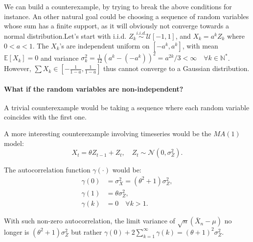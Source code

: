 We can build a counterexample, by trying to break the above conditions for instance. An other natural goal could be choosing a sequence of random variables whose sum has a finite support, as it will obviously not converge towards a normal distribution.\newline Let's start with i.i.d. $Z_k \stackrel{i.i.d.}{\sim} \mathcal{U}\left[-1, 1\right]$, and $X_k = a^k Z_k$ where $0<a<1$. The $X_k$'s are independent uniform on $\left[-a^k, a^k\right]$, with mean $\mathbb{E}\left[X_k\right] = 0$ and variance  $\sigma_k^2 = \frac1{12}(a^k - (-a^k))^2 = a^{2k}/3 < \infty \quad \forall k \in \mathbb{N}^{*}$. However, $\sum X_k \in \left[-\frac1{1-a}, \frac1{1-a}\right]$ thus cannot converge to a Gaussian distribution.

\paragraph*{What if the random variables are non-independent?}

A trivial counterexample would be taking a sequence where each random variable coincides with the first one.

A more interesting counterexample involving timeseries would be the $MA(1)$ model: \[X_t = \theta Z_{t-1} + Z_t, \quad Z_t \sim \mathcal{N}(0, \sigma_Z^2).\]

The autocorrelation function $\gamma(\cdot)$ would be:
\begin{align*}
    \gamma(0) &= \sigma_X^2 = (\theta^2 +1) \sigma_Z^2,\\
    \gamma(1) &=\theta \sigma_Z^2,\\
    \gamma(k) &= 0 \quad \forall k > 1.
\end{align*}

With such non-zero autocorrelation, the limit variance of $\sqrt{n}(\bar{X}_n - \mu)$ no longer is $(\theta^2 +1) \sigma_Z^2$  but rather $\gamma(0) + 2 \sum_{k=1}^\infty \gamma(k) = 
(\theta +1)^2 \sigma_Z^2$.
